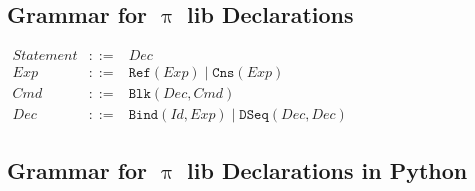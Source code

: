 \documentclass[a4paper,openany]{book}
\begin{document}
\subsection{Grammar for $\uppi$ lib
Declarations}\label{grammar-for-ux3c0-lib-declarations}

$
\begin{array}{rcl}
Statement & ::= & Dec \\
Exp       & ::= & \mathtt{Ref}(Exp) \mid \mathtt{Cns}(Exp) \\
Cmd       & ::= & \mathtt{Blk}(Dec, Cmd) \\
Dec       & ::= & \mathtt{Bind}(Id, Exp) \mid \mathtt{DSeq}(Dec, Dec) 
\end{array}
$

    \subsection{Grammar for $\uppi$ lib Declarations in
Python}\label{grammar-for-ux3c0-lib-declarations-in-python}
\end{document}
